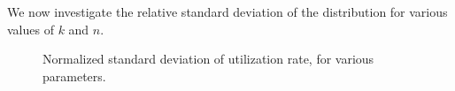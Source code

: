 \documentclass[
  letterpaper,
  DIV=11,
  numbers=noendperiod]{scrartcl}
\begin{document}
We now investigate the relative standard deviation of the distribution
for various values of $k$ and $n$.

\begin{figure}

\begin{minipage}[t]{0.50\linewidth}

{\centering 


}

\end{minipage}%
%
\begin{minipage}[t]{0.50\linewidth}

{\centering 


}

\end{minipage}%

\caption{\label{fig-sd}Normalized standard deviation of utilization
rate, for various parameters.}

\end{figure}
\end{document}
